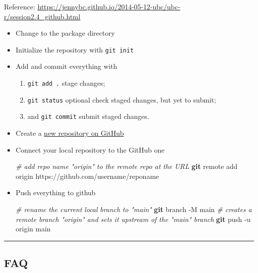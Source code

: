 \documentclass[
  a4paper,
  twoside,
  openright]{book}
\newenvironment{Shaded}{\begin{snugshade}}{\end{snugshade}}
\newcommand{\AttributeTok}[1]{\textcolor[rgb]{0.13,0.29,0.53}{#1}}
\newcommand{\CommentTok}[1]{\textcolor[rgb]{0.56,0.35,0.01}{\textit{#1}}}
\newcommand{\FunctionTok}[1]{\textcolor[rgb]{0.13,0.29,0.53}{\textbf{#1}}}
\newcommand{\NormalTok}[1]{#1}
\providecommand{\tightlist}{%
  \setlength{\itemsep}{0pt}\setlength{\parskip}{0pt}}
\theoremstyle{definition}
\theoremstyle{definition}
\theoremstyle{definition}
\theoremstyle{definition}
\theoremstyle{remark}
\begin{document}
Reference: \url{https://jennybc.github.io/2014-05-12-ubc/ubc-r/session2.4_github.html}

\begin{itemize}
\item
  Change to the package directory
\item
  Initialize the repository with \texttt{git\ init}
\item
  Add and commit everything with

  \begin{enumerate}
  \def\labelenumi{\arabic{enumi}.}
  \tightlist
  \item
    \texttt{git\ add\ .} stage changes;
  \item
    \texttt{git\ status} optional check staged changes, but yet to submit;
  \item
    and \texttt{git\ commit} submit staged changes.
  \end{enumerate}
\item
  Create a \href{https://github.com/new}{new repository on GitHub}
\item
  Connect your local repository to the GitHub one

\begin{Shaded}
\begin{Highlighting}[]
\CommentTok{\# add repo name "origin" to the remote repo at the URL}
\FunctionTok{git}\NormalTok{ remote add origin https://github.com/username/reponame}
\end{Highlighting}
\end{Shaded}
\item
  Push everything to github

\begin{Shaded}
\begin{Highlighting}[]
\CommentTok{\# rename the current local branch to "main"}
\FunctionTok{git}\NormalTok{ branch }\AttributeTok{{-}M}\NormalTok{ main}
\CommentTok{\# creates a remote branch "origin" and sets it upstream of the "main" branch}
\FunctionTok{git}\NormalTok{ push }\AttributeTok{{-}u}\NormalTok{ origin main}
\end{Highlighting}
\end{Shaded}
\end{itemize}

\begin{center}\rule{0.5\linewidth}{0.5pt}\end{center}

\subsection{FAQ}\label{faq}
\end{document}
